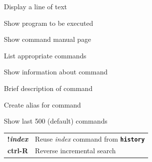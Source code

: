 \documentclass[12pt, a4paper]
{article}
\begin{document}
\begin{multicols}{3}
\begin{description}[nolistsep]
	\item[echo] Display a line of text
	\item[which] Show program to be executed
	\item[man] Show command manual page
	\item[apropos] List appropriate commands
	\item[info] Show information about command
	\item[whatis] Brief description of command
	\item[alias] Create alias for command
	\item[history] Show last 500 (default) commands
	\item
	\begin{tabular}{cl}
		{\large \ttfamily \textbf{!\textit{index}}} & Reuse \textit{index} command from \texttt{\textbf{history}}\\
		{\large \ttfamily \textbf{ctrl-R}} & Reverse incremental search \\
	\end{tabular}
\end{description}



\end{multicols}
\end{document}

